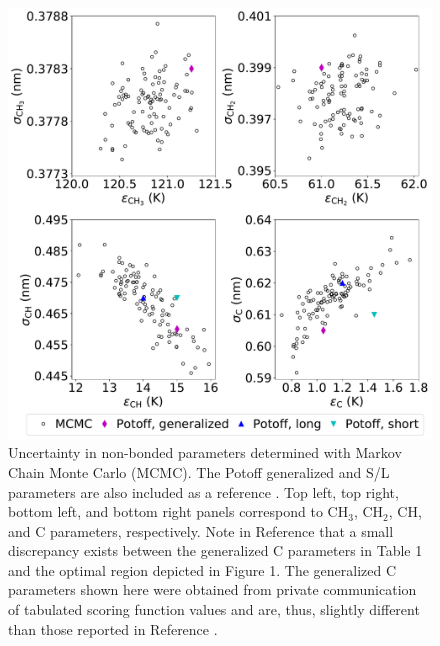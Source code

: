 \documentclass[preprint,review,12pt]{elsarticle}
\begin{document}
    \begin{figure}[H]
    	\centering
    	\includegraphics[width=6.4in]{MCMC_nonbonded.pdf}
    	\caption{Uncertainty in non-bonded parameters determined with Markov Chain Monte Carlo (MCMC). The Potoff generalized and S/L parameters are also included as a reference \cite{Mie,Potoff_branched}. Top left, top right, bottom left, and bottom right panels correspond to CH$_3$, CH$_2$, CH, and C parameters, respectively. Note in Reference  that a small discrepancy exists between the generalized C parameters in Table 1 and the optimal region depicted in Figure 1. The generalized C parameters shown here were obtained from private communication of tabulated scoring function values and are, thus, slightly different than those reported in Reference .}		
    	\label{fig:nonbonded_uncertainty}
    \end{figure}
    
	
\end{document}
